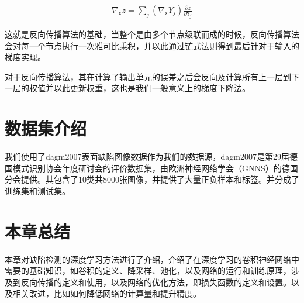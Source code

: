 \begin{eqnarray}
    \nabla_{\mathtt{X}}z = \sum_{j}(\nabla_{\mathtt{X}}Y_j)\frac{\partial z}{\partial \mathtt{Y}_j}
\end{eqnarray}

这就是反向传播算法的基础，当整个是由多个节点级联而成的时候，反向传播算法会对每一个节点执行一次雅可比乘积，并以此通过链式法则得到最后针对于输入的梯度实现。

对于反向传播算法，其在计算了输出单元的误差之后会反向及计算所有上一层到下一层的权值并以此更新权重，这也是我们一般意义上的梯度下降法。

\section{数据集介绍}
我们使用了dagm2007表面缺陷图像数据作为我们的数据源，dagm2007是第29届德国模式识别协会年度研讨会的评价数据集，由欧洲神经网络学会（GNNS）的德国分会提供。其包含了10类共8000张图像，并提供了大量正负样本和标签。并分成了训练集和测试集。

\section{本章总结}
本章对缺陷检测的深度学习方法进行了介绍，介绍了在深度学习的卷积神经网络中需要的基础知识，如卷积的定义、降采样、池化，以及网络的运行和训练原理，涉及到反向传播的定义和使用，以及网络的优化方法，即损失函数的定义和设置。以及相关改进，比如如何降低网络的计算量和提升精度。
